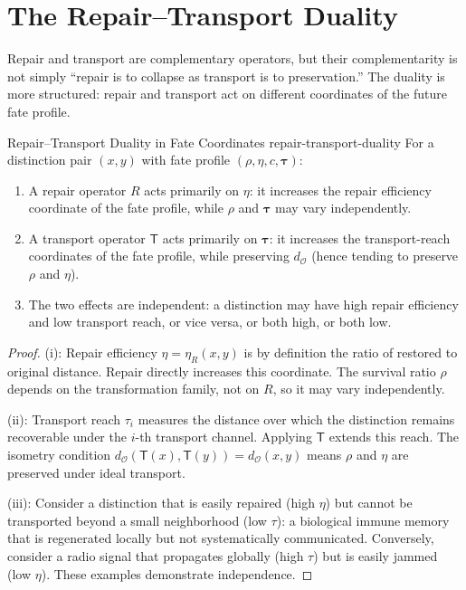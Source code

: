 \documentclass[12pt,twoside,openright]{book}
\newcommand{\survRatio}{\rho}             %
\newcommand{\repEff}{\eta}               %
\newcommand{\collapseInd}{c}             %
\newcommand{\distMetric}{d_{\mathcal{O}}}
\providecommand{\repairEff}[1]{\eta_{R}(#1)}
\providecommand{\transpOp}{\mathsf{T}}
\begin{document}
\section{The Repair--Transport Duality}

Repair and transport are complementary operators, but their
complementarity is not simply ``repair is to collapse as
transport is to preservation.'' The duality is more structured:
repair and transport act on different coordinates of the future
fate profile.

\begin{proposition}{Repair--Transport Duality in Fate Coordinates}%
  {repair-transport-duality}
For a distinction pair $(x,y)$ with fate profile
$(\survRatio,\repEff,\collapseInd,\boldsymbol{\tau})$:
\begin{enumerate}[nosep,label=(\roman*)]
\item A repair operator $R$ acts primarily on $\repEff$:
  it increases the repair efficiency coordinate
  of the fate profile, while $\survRatio$ and
  $\boldsymbol{\tau}$ may vary independently.
\item A transport operator $\transpOp$ acts primarily on
  $\boldsymbol{\tau}$: it increases the transport-reach
  coordinates of the fate profile, while preserving
  $\distMetric$ (hence tending to preserve $\survRatio$
  and $\repEff$).
\item The two effects are independent: a distinction may have
  high repair efficiency and low transport reach, or vice
  versa, or both high, or both low.
\end{enumerate}
\begin{proof}
(i): Repair efficiency $\repEff=\repairEff{x,y}$ is by
definition the ratio of restored to original distance.
Repair directly increases this coordinate. The survival ratio
$\survRatio$ depends on the transformation family, not on $R$,
so it may vary independently.

(ii): Transport reach $\tau_i$ measures the distance over
which the distinction remains recoverable under the $i$-th
transport channel. Applying $\transpOp$ extends this reach.
The isometry condition $\distMetric(\transpOp(x),\transpOp(y))
=\distMetric(x,y)$ means $\survRatio$ and $\repEff$ are
preserved under ideal transport.

(iii): Consider a distinction that is easily repaired (high
$\repEff$) but cannot be transported beyond a small
neighborhood (low $\tau$): a biological immune memory that
is regenerated locally but not systematically communicated.
Conversely, consider a radio signal that propagates globally
(high $\tau$) but is easily jammed (low $\repEff$). These
examples demonstrate independence.
\end{proof}
\end{proposition}
\end{document}
